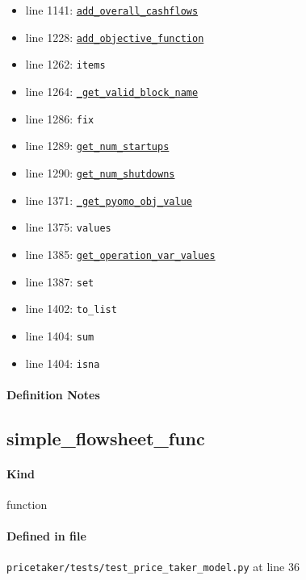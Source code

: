 \documentclass[11pt]{report}
\begin{document}
\begin{itemize}[leftmargin=*]
  \item line 1141: \hyperref[def:pricetaker-price_taker_model.py:PriceTakerModel.add_overall_cashflows:L997]{\texttt{add\_overall\_cashflows}}
  \item line 1228: \hyperref[def:pricetaker-price_taker_model.py:PriceTakerModel.add_objective_function:L1123]{\texttt{add\_objective\_function}}
  \item line 1262: \texttt{items}
  \item line 1264: \hyperref[def:pricetaker-price_taker_model.py:PriceTakerModel._get_valid_block_name:L645]{\texttt{\_get\_valid\_block\_name}}
  \item line 1286: \texttt{fix}
  \item line 1289: \hyperref[def:pricetaker-price_taker_model.py:PriceTakerModel.get_num_startups:L1182]{\texttt{get\_num\_startups}}
  \item line 1290: \hyperref[def:pricetaker-price_taker_model.py:PriceTakerModel.get_num_shutdowns:L1186]{\texttt{get\_num\_shutdowns}}
  \item line 1371: \hyperref[def:pricetaker-price_taker_model.py:PriceTakerModel._get_pyomo_obj_value:L1191]{\texttt{\_get\_pyomo\_obj\_value}}
  \item line 1375: \texttt{values}
  \item line 1385: \hyperref[def:pricetaker-price_taker_model.py:PriceTakerModel.get_operation_var_values:L1202]{\texttt{get\_operation\_var\_values}}
  \item line 1387: \texttt{set}
  \item line 1402: \texttt{to\_list}
  \item line 1404: \texttt{sum}
  \item line 1404: \texttt{isna}
\end{itemize}
\paragraph{Definition Notes}
\subsection{simple\_flowsheet\_func}
\label{def:pricetaker-tests-test_price_taker_model.py:simple_flowsheet_func:L36}
\paragraph{Kind} function
\paragraph{Defined in file} \texttt{pricetaker/tests/test\_price\_taker\_model.py} at line 36
\end{document}
